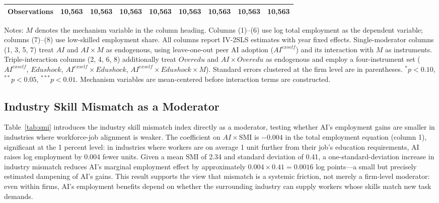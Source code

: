 \documentclass[12pt,a4paper]{article}
\theoremstyle{predstyle}
\theoremstyle{plain}
\newcommand{\SMI}{\mathrm{SMI}}
\newcommand{\Overedu}{\mathit{Overedu}}
\begin{document}
\begin{landscape}
\begin{table}[H]
\begin{threeparttable}
\begin{tabular}{lcccccccc}
\midrule
Observations & 10,563 & 10,563 & 10,563 & 10,563 & 10,563 & 10,563 & 10,563 & 10,563 \\
\bottomrule
\end{tabular}
\begin{tablenotes}
\footnotesize
\item Notes: \(M\) denotes the mechanism variable in the column heading. Columns (1)--(6) use log total employment as the dependent variable; columns (7)--(8) use low-skilled employment share. All columns report IV-2SLS estimates with year fixed effects. Single-moderator columns (1, 3, 5, 7) treat \(AI\) and \(AI \times M\) as endogenous, using leave-one-out peer AI adoption (\(AI^{exself}\)) and its interaction with \(M\) as instruments. Triple-interaction columns (2, 4, 6, 8) additionally treat \(\Overedu\) and \(AI \times \Overedu\) as endogenous and employ a four-instrument set (\(AI^{exself}\), \(Edushock\), \(AI^{exself} \times Edushock\), \(AI^{exself} \times Edushock \times M\)). Standard errors clustered at the firm level are in parentheses. \(^{*}p<0.10\), \(^{**}p<0.05\), \(^{***}p<0.01\). Mechanism variables are mean-centered before interaction terms are constructed.
\end{tablenotes}
\end{threeparttable}
\end{table}
\end{landscape}

\subsection{Industry Skill Mismatch as a Moderator}

Table~\ref{tab:smi} introduces the industry skill mismatch index directly as a moderator, testing whether AI's employment gains are smaller in industries where workforce-job alignment is weaker. The coefficient on \(AI \times \SMI\) is \(-0.004\) in the total employment equation (column 1), significant at the 1 percent level: in industries where workers are on average 1 unit further from their job's education requirements, AI raises log employment by 0.004 fewer units. Given a mean \(\SMI\) of 2.34 and standard deviation of 0.41, a one-standard-deviation increase in industry mismatch reduces AI's marginal employment effect by approximately \(0.004 \times 0.41 = 0.0016\) log points---a small but precisely estimated dampening of AI's gains. This result supports the view that mismatch is a systemic friction, not merely a firm-level moderator: even within firms, AI's employment benefits depend on whether the surrounding industry can supply workers whose skills match new task demands.
\end{document}
